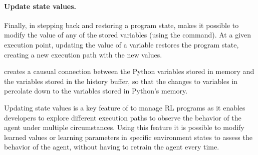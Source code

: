 \paragraph{Update state values.}
Finally, in stepping back and restoring a program state, \flik makes it possible to modify the value of 
any of the stored variables (using the  command). At a given execution point, updating 
the value of a variable restores the program state, creating a new execution path with the new 
values. 

\flik creates a causual connection between the Python variables stored in memory and the variables 
stored in the history buffer, so that the changes to variables in \flik percolate down to the variables 
stored in Python's memory.

Updating state values is a key feature of \flik to manage \ac{RL} programs as it enables developers 
to explore different execution paths to observe the behavior of the agent under multiple 
circumstances. Using this feature it is possible to modify learned values or learning parameters in 
specific environment states to assess the behavior of the agent, without having to retrain the agent 
every time. 


\endinput

video \url{https://drive.google.com/file/d/1NyipuWsRr6ZrIbtlvU5qyooHS2aVsWXc/view?usp=sharing}.